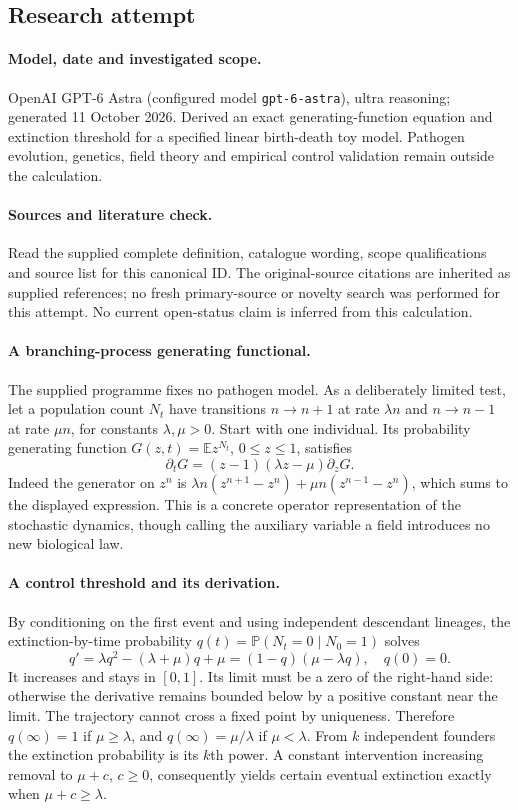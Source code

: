 \documentclass[11pt]{article}
\begin{document}
\subsection{Research attempt}
\paragraph{Model, date and investigated scope.}
OpenAI GPT-6 Astra (configured model \texttt{gpt-6-astra}), ultra reasoning; generated 11 October 2026. Derived an exact generating-function equation and extinction threshold for a specified linear birth-death toy model. Pathogen evolution, genetics, field theory and empirical control validation remain outside the calculation.

\paragraph{Sources and literature check.}
Read the supplied complete definition, catalogue wording, scope qualifications and source list for this canonical ID. The original-source citations are inherited as supplied references; no fresh primary-source or novelty search was performed for this attempt. No current open-status claim is inferred from this calculation.

\paragraph{A branching-process generating functional.}The supplied programme fixes no pathogen model. As a deliberately limited test, let a population count \(N_t\) have transitions \(n\to n+1\) at rate \(\lambda n\) and \(n\to n-1\) at rate \(\mu n\), for constants \(\lambda,\mu>0\). Start with one individual. Its probability generating function \(G(z,t)=\mathbb E z^{N_t}\), \(0\le z\le1\), satisfies
\[\partial_tG=(z-1)(\lambda z-\mu)\partial_zG.\]
Indeed the generator on \(z^n\) is \(\lambda n(z^{n+1}-z^n)+\mu n(z^{n-1}-z^n)\), which sums to the displayed expression. This is a concrete operator representation of the stochastic dynamics, though calling the auxiliary variable a field introduces no new biological law.
\paragraph{A control threshold and its derivation.}By conditioning on the first event and using independent descendant lineages, the extinction-by-time probability \(q(t)=\mathbb P(N_t=0\mid N_0=1)\) solves
\[q'=\lambda q^2-(\lambda+\mu)q+\mu=(1-q)(\mu-\lambda q),\quad q(0)=0.\]
It increases and stays in \([0,1]\). Its limit must be a zero of the right-hand side: otherwise the derivative remains bounded below by a positive constant near the limit. The trajectory cannot cross a fixed point by uniqueness. Therefore \(q(\infty)=1\) if \(\mu\ge\lambda\), and \(q(\infty)=\mu/\lambda\) if \(\mu<\lambda\). From \(k\) independent founders the extinction probability is its \(k\)th power. A constant intervention increasing removal to \(\mu+c\), \(c\ge0\), consequently yields certain eventual extinction exactly when \(\mu+c\ge\lambda\).
\end{document}
